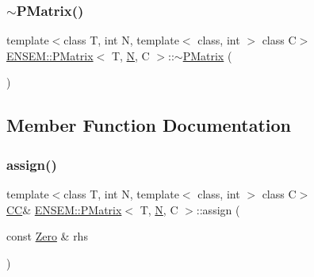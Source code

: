 \subsubsection{\texorpdfstring{$\sim$PMatrix()}{~PMatrix()}\hspace{0.1cm}{\footnotesize\ttfamily [3/3]}}
{\footnotesize\ttfamily template$<$class T, int N, template$<$ class, int $>$ class C$>$ \\
\mbox{\hyperlink{classENSEM_1_1PMatrix}{E\+N\+S\+E\+M\+::\+P\+Matrix}}$<$ T, \mbox{\hyperlink{adat__devel_2lib_2hadron_2operator__name__util_8cc_a7722c8ecbb62d99aee7ce68b1752f337}{N}}, C $>$\+::$\sim$\mbox{\hyperlink{classENSEM_1_1PMatrix}{P\+Matrix}} (\begin{DoxyParamCaption}{ }\end{DoxyParamCaption})\hspace{0.3cm}{\ttfamily [inline]}}



\subsection{Member Function Documentation}
\mbox{\label{classENSEM_1_1PMatrix_a4d8aeb469d2295dc8c555a0180ab0613}} 
\subsubsection{\texorpdfstring{assign()}{assign()}\hspace{0.1cm}{\footnotesize\ttfamily [1/9]}}
{\footnotesize\ttfamily template$<$class T, int N, template$<$ class, int $>$ class C$>$ \\
\mbox{\hyperlink{classENSEM_1_1PMatrix_a744bac549029029effe32dc1705660ec}{CC}}\& \mbox{\hyperlink{classENSEM_1_1PMatrix}{E\+N\+S\+E\+M\+::\+P\+Matrix}}$<$ T, \mbox{\hyperlink{adat__devel_2lib_2hadron_2operator__name__util_8cc_a7722c8ecbb62d99aee7ce68b1752f337}{N}}, C $>$\+::assign (\begin{DoxyParamCaption}\item[{const \mbox{\hyperlink{structENSEM_1_1Zero}{Zero}} \&}]{rhs }\end{DoxyParamCaption})\hspace{0.3cm}{\ttfamily [inline]}}



